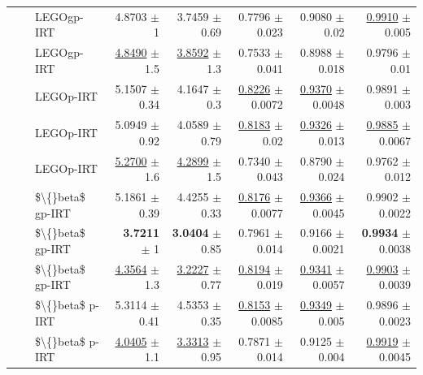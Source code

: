\begin{longtable}{llp{}rrrrr}
 &  & LEGOgp-IRT & 4.8703 {\scriptsize $\pm$ 1} & 3.7459 {\scriptsize $\pm$ 0.69} & 0.7796 {\scriptsize $\pm$ 0.023} & 0.9080 {\scriptsize $\pm$ 0.02} & \underline{0.9910} {\scriptsize $\pm$ 0.005} \\
 &  & LEGOgp-IRT & \underline{4.8490} {\scriptsize $\pm$ 1.5} & \underline{3.8592} {\scriptsize $\pm$ 1.3} & 0.7533 {\scriptsize $\pm$ 0.041} & 0.8988 {\scriptsize $\pm$ 0.018} & 0.9796 {\scriptsize $\pm$ 0.01} \\
 &  & LEGOp-IRT & 5.1507 {\scriptsize $\pm$ 0.34} & 4.1647 {\scriptsize $\pm$ 0.3} & \underline{0.8226} {\scriptsize $\pm$ 0.0072} & \underline{0.9370} {\scriptsize $\pm$ 0.0048} & 0.9891 {\scriptsize $\pm$ 0.003} \\
 &  & LEGOp-IRT & 5.0949 {\scriptsize $\pm$ 0.92} & 4.0589 {\scriptsize $\pm$ 0.79} & \underline{0.8183} {\scriptsize $\pm$ 0.02} & \underline{0.9326} {\scriptsize $\pm$ 0.013} & \underline{0.9885} {\scriptsize $\pm$ 0.0067} \\
 &  & LEGOp-IRT & \underline{5.2700} {\scriptsize $\pm$ 1.6} & \underline{4.2899} {\scriptsize $\pm$ 1.5} & 0.7340 {\scriptsize $\pm$ 0.043} & 0.8790 {\scriptsize $\pm$ 0.024} & 0.9762 {\scriptsize $\pm$ 0.012} \\
 &  & \$\textbackslash\{\}beta\$ gp-IRT & 5.1861 {\scriptsize $\pm$ 0.39} & 4.4255 {\scriptsize $\pm$ 0.33} & \underline{0.8176} {\scriptsize $\pm$ 0.0077} & \underline{0.9366} {\scriptsize $\pm$ 0.0045} & 0.9902 {\scriptsize $\pm$ 0.0022} \\
 &  & \$\textbackslash\{\}beta\$ gp-IRT & \textbf{3.7211} {\scriptsize $\pm$ 1} & \textbf{3.0404} {\scriptsize $\pm$ 0.85} & 0.7961 {\scriptsize $\pm$ 0.014} & 0.9166 {\scriptsize $\pm$ 0.0021} & \textbf{0.9934} {\scriptsize $\pm$ 0.0038} \\
 &  & \$\textbackslash\{\}beta\$ gp-IRT & \underline{4.3564} {\scriptsize $\pm$ 1.3} & \underline{3.2227} {\scriptsize $\pm$ 0.77} & \underline{0.8194} {\scriptsize $\pm$ 0.019} & \underline{0.9341} {\scriptsize $\pm$ 0.0057} & \underline{0.9903} {\scriptsize $\pm$ 0.0039} \\
 &  & \$\textbackslash\{\}beta\$ p-IRT & 5.3114 {\scriptsize $\pm$ 0.41} & 4.5353 {\scriptsize $\pm$ 0.35} & \underline{0.8153} {\scriptsize $\pm$ 0.0085} & \underline{0.9349} {\scriptsize $\pm$ 0.005} & 0.9896 {\scriptsize $\pm$ 0.0023} \\
 &  & \$\textbackslash\{\}beta\$ p-IRT & \underline{4.0405} {\scriptsize $\pm$ 1.1} & \underline{3.3313} {\scriptsize $\pm$ 0.95} & 0.7871 {\scriptsize $\pm$ 0.014} & 0.9125 {\scriptsize $\pm$ 0.004} & \underline{0.9919} {\scriptsize $\pm$ 0.0045} \\

\end{longtable}
